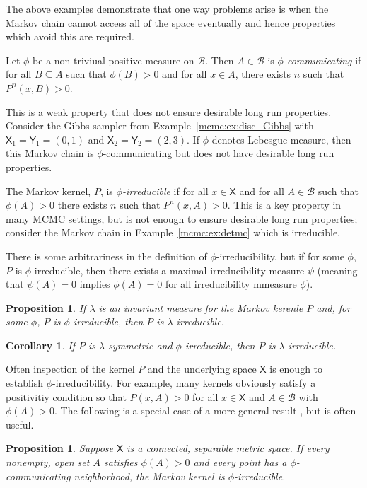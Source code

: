 \documentclass[12pt]{article}
\theoremstyle{plain}
\newtheorem{prop}[thm]{Proposition}
\newtheorem{cor}{Corollary}[section]
\theoremstyle{definition}
\theoremstyle{remark}
\newcommand{\X}{\mathsf{X}}
\newcommand{\Y}{\mathsf{Y}}
\newcommand{\B}{\mathcal{B}}
\begin{document}
The above examples demonstrate that one way problems arise is when the
Markov chain cannot access all of the space eventually and hence
properties which avoid this are required.

Let $\phi$ be a non-triviual positive measure on $\B$.  Then $A \in
\B$ is {\em $\phi$-communicating} if for all $B \subseteq A$ such that
$\phi(B) > 0$ and for all $x \in A$, there exists $n$ such that
$P^n(x,B) >0$.

This is a weak property that does not ensure desirable long run
properties.  Consider the Gibbs sampler from
Example~\ref{mcmc:ex:disc_Gibbs} with $\X_1 = \Y_1 = (0,1)$ and
$\X_2 = \Y_2 = (2,3)$. If $\phi$ denotes Lebesgue measure, then this
Markov chain is $\phi$-communicating but does not have desirable long
run properties.

The Markov kernel, $P$,  is {\em $\phi$-irreducible} if for all $x \in \X$ and
for all $A \in \B$ such that $\phi(A) > 0$ there exists $n$ such that
$P^n (x, A) > 0$.  This is a key property in many MCMC settings, but
is not enough to ensure desirable long run properties; consider the
Markov chain in Example~\ref{mcmc:ex:detmc} which is irreducible.

There is some arbitrariness in the definition of
$\phi$-irreducibility, but if for some $\phi$, $P$ is
$\phi$-irreducible, then there exists a maximal irreducibility
measure $\psi$ (meaning that $\psi(A) = 0$ implies $\phi(A)=0$ for all
irreducibility mmeasure $\phi$).

\begin{prop}
  \label{mcmc:prop:inv_irreducible}
  If $\lambda$ is an invariant measure for the Markov kerenle $P$ and,
  for some $\phi$, $P$ is $\phi$-irreducible, then $P$ is
  $\lambda$-irreducible. 
\end{prop}

\begin{cor}
  If $P$ is $\lambda$-symmetric and $\phi$-irreducible, then $P$ is
  $\lambda$-irreducible.  
 \end{cor}

Often inspection of the kernel $P$ and the underlying space $\X$
is enough to establish $\phi$-irreducibility.  For example, many kernels
obviously satisfy a positivitiy condition so that $P(x, A) > 0$ for
all $x \in \X$ and $A \in \B$ with $\phi(A) > 0$. The following is a
special case of a more general result \cite[][Theorem 3]{geye:2014},
but is often useful.

\begin{prop}
  \label{mcmc:prop:irred}
Suppose $\X$ is a connected, separable metric space.  If every
nonempty, open set $A$ satisfies $\phi(A)>0$ and every point has a
$\phi$-communicating neighborhood, the Markov kernel is
$\phi$-irreducible.  
\end{prop}
\end{document}
